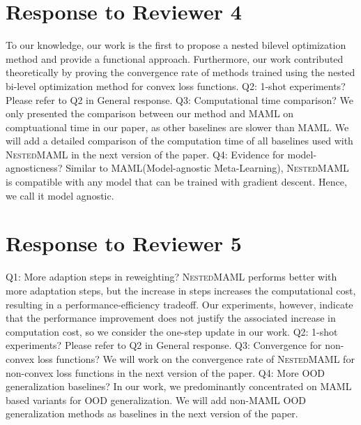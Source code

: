 \documentclass[letterpaper]{article} %
\newcommand{\sysname}{\textsc{NestedMAML}}
\begin{document}
\section{Response to Reviewer 4}

{} To our knowledge, our work is the first to propose a nested bilevel optimization method and provide a functional approach. Furthermore, our work contributed theoretically by proving the convergence rate of methods trained using the nested bi-level optimization method for convex loss functions. {\noindent}{\color{blue}Q2: 1-shot experiments? }Please refer to Q2 in General response. {\noindent}{\color{blue}Q3: Computational time comparison? } We only presented the comparison between our method and MAML on comptuational time in our paper, as other baselines are slower than MAML. We will add a detailed comparison of the computation time of all baselines used with \sysname{} in the next version of the paper.{\noindent} {\color{blue}Q4: Evidence for model-agnosticness? }Similar to MAML(Model-agnostic Meta-Learning), \sysname{} is compatible with any model that can be trained with gradient descent. Hence, we call it model agnostic.
\vspace{-3mm}
\section{Response to Reviewer 5}
{\color{blue}Q1: More adaption steps in reweighting?} \sysname{} performs better with more adaptation steps, but the increase in steps increases the computational cost, resulting in a performance-efficiency tradeoff. Our experiments, however, indicate that the performance improvement does not justify the associated increase in computation cost, so we consider the one-step update in our work. {\noindent}{\color{blue}Q2: 1-shot experiments? } Please refer to Q2 in General response. {\noindent}{\color{blue}Q3: Convergence for non-convex loss functions? }We will work on the convergence rate of \sysname{} for non-convex loss functions in the next version of the paper. {\noindent}{\color{blue}Q4: More OOD generalization baselines? } In our work, we predominantly concentrated on MAML based variants for OOD generalization. We will add non-MAML OOD generalization methods as baselines in the next version of the paper.


\end{document}
